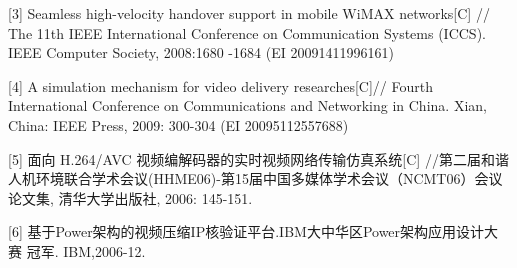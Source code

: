 \documentclass[
    doctor,
    truefont,
    pdflinks,
    ]{xjtuthesis}
\begin{document}
\begin{spacing}{1.2}
{[3] Seamless high-velocity handover support in mobile WiMAX networks[C] //  The 11th IEEE  International Conference on Communication Systems (ICCS).  IEEE Computer Society, 2008:1680 -1684 (EI 20091411996161)

[4] A simulation mechanism for video delivery researches[C]// Fourth International Conference on Communications and Networking in China. Xian, China: IEEE Press, 2009: 300-304 (EI 20095112557688)

[5] 面向 H.264/AVC 视频编解码器的实时视频网络传输仿真系统[C] //第二届和谐人机环境联合学术会议(HHME06)-第15届中国多媒体学术会议（NCMT06）会议论文集, 清华大学出版社, 2006: 145-151.

[6] 基于Power架构的视频压缩IP核验证平台.IBM大中华区Power架构应用设计大赛 冠军. IBM,2006-12.
}
\fi
\end{spacing}

\xjtuacademicintegrity
\end{document}
